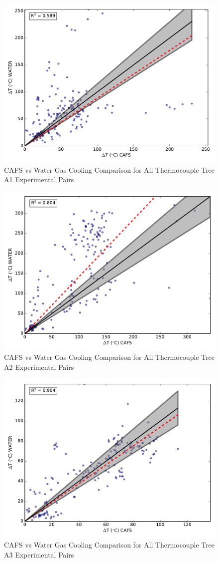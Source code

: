 \documentclass[12pt,oneside]{book}
\begin{document}
\begin{figure}[!ht]
	\includegraphics[width=.7\columnwidth]{../Figures/Gas_Cooling/Combined_A1_scatter}
	\caption{CAFS vs Water Gas Cooling Comparison for All Thermocouple Tree A1 Experimental Pairs}
	\label{fig:CAFS_Water_A1_all}
\end{figure}

\begin{figure}[!ht]
	\includegraphics[width=.7\columnwidth]{../Figures/Gas_Cooling/Combined_A2_scatter}
	\caption{CAFS vs Water Gas Cooling Comparison for All Thermocouple Tree A2 Experimental Pairs}
	\label{fig:CAFS_Water_A2_all}
\end{figure}

\begin{figure}[!ht]
	\includegraphics[width=.7\columnwidth]{../Figures/Gas_Cooling/Combined_A3_scatter}
	\caption{CAFS vs Water Gas Cooling Comparison for All Thermocouple Tree A3 Experimental Pairs}
	\label{fig:CAFS_Water_A3_all}
\end{figure}
\end{document}
